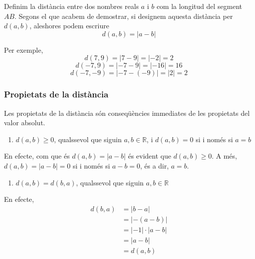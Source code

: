 Definim la distància entre dos nombres reals $a$ i $b$ com la
longitud del segment $AB$. Segons el que acabem de demostrar, si
designem aquesta distància per $d(a,b)$, aleshores podem escriure%
\begin{equation*}
d(a,b)=\left\vert a-b\right\vert
\end{equation*}

Per exemple, 
\begin{equation*}
d(7,9)=\left\vert 7-9\right\vert =\left\vert -2\right\vert =2
\end{equation*}%
\begin{equation*}
d(-7,9)=\left\vert -7-9\right\vert =\left\vert -16\right\vert =16
\end{equation*}%
\begin{equation*}
d(-7,-9)=\left\vert -7-(-9)\right\vert =\left\vert 2\right\vert =2
\end{equation*}

\subsubsection{Propietats de la distància}

Les propietats de la distància són conseqüències immediates de les
propietats del valor absolut.

\begin{enumerate}
\item $d(a,b)\geq 0$, qualssevol que siguin $a,b\in \mathbb{R}$, i $d(a,b)=0$
si i només si $a=b$
\end{enumerate}

En efecte, com que és $d(a,b)=\left\vert a-b\right\vert$ és evident que $%
d(a,b)\geq 0$. A més, $d(a,b)=\left\vert a-b\right\vert =0$ si i només si $a-b=0$, és a dir, $a=b$.

\begin{enumerate}
\item[2.] $d(a,b)=d(b,a)$, qualssevol que siguin $a,b\in \mathbb{R}$
\end{enumerate}

En efecte, 
\begin{align*}
d(b,a) &=\left\vert b-a\right\vert \\
&=\left\vert -(a-b)\right\vert \\
&=\left\vert -1\right\vert \cdot \left\vert a-b\right\vert \\
&=\left\vert a-b\right\vert \\
&=d(a,b)
\end{align*}


